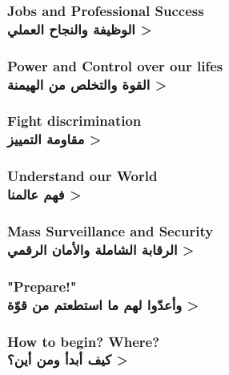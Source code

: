 \documentclass[9pt]{beamer}
\begin{document}
	\begin{frame}
		\frametitle{
			Jobs and Professional Success\\
			\<
			الوظيفة والنجاح العملي
			>
		}
		
		
	\end{frame}
	
	\begin{frame}
		\frametitle{
			Power and Control over our lifes\\
			\<
			القوة والتخلص من الهيمنة
			>
		}
	\end{frame}
	
	\begin{frame}
		\frametitle{
			Fight discrimination\\
			\<
			مقاومة التمييز
			>
		}
	\end{frame}
	
	\begin{frame}
		\frametitle{
			Understand our World\\
			\<
			فهم عالمنا
			>
		}
	\end{frame}
	
	\begin{frame}
		\frametitle{
			Mass Surveillance and Security\\
			\<
			الرقابة الشاملة والأمان الرقمي
			>
		}
	\end{frame}
	
	\begin{frame}
		\frametitle{
			"Prepare!"\\
			\<
			وأعدّوا لهم ما استطعتم من قوّة
			>
		}
	\end{frame}
	
	\begin{frame}
		\frametitle{
			How to begin? Where?\\
			\<
			كيف أبدأ ومن أين؟
			>
		}
	\end{frame}
	
\end{document}
